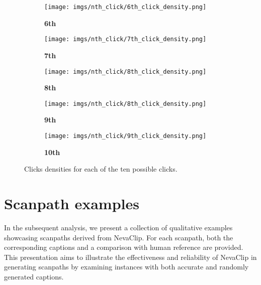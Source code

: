 \documentclass{article}
\begin{document}
\begin{figure}[htbp]
\begin{subfigure}[t]{0.195\textwidth}
    \centering
    \caption{\textbf{6th}}
    \texttt{[image: imgs/nth\_click/6th\_click\_density.png]}
    \label{fig:webapp_instructions}
  \end{subfigure}
\begin{subfigure}[t]{0.195\textwidth}
    \centering
    \caption{\textbf{7th}}
    \texttt{[image: imgs/nth\_click/7th\_click\_density.png]}
    \label{fig:webapp_instructions}
  \end{subfigure}
\begin{subfigure}[t]{0.195\textwidth}
    \centering
    \caption{\textbf{8th}}
    \texttt{[image: imgs/nth\_click/8th\_click\_density.png]}
  \end{subfigure}
\begin{subfigure}[t]{0.195\textwidth}
    \centering
    \caption{\textbf{9th}}
    \texttt{[image: imgs/nth\_click/8th\_click\_density.png]}
    \label{fig:webapp_instructions}
  \end{subfigure}
\begin{subfigure}[t]{0.195\textwidth}
    \centering
    \caption{\textbf{10th}}
    \texttt{[image: imgs/nth\_click/9th\_click\_density.png]}
  \end{subfigure}
  
  \caption{Clicks densities for each of the ten possible clicks.}
  \label{fig:nth_cklick}

\end{figure}

\newpage
\section{Scanpath examples}
In the subsequent analysis, we present a collection of qualitative examples showcasing scanpaths derived from NevaClip. For each scanpath, both the corresponding captions and a comparison with human reference are provided. This presentation aims to illustrate the effectiveness and reliability of NevaClip in generating scanpaths by examining instances with both accurate and randomly generated captions.
\end{document}
